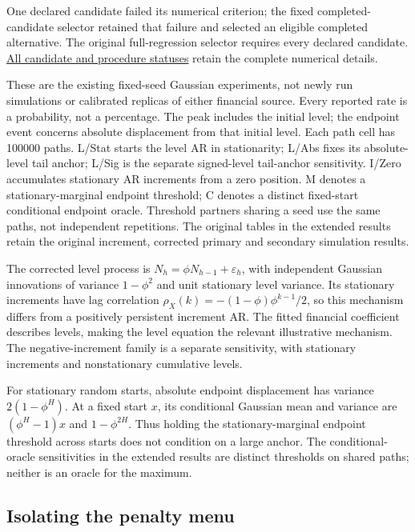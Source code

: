 \documentclass[10pt,a4paper]{article}
\begin{document}
One declared candidate failed its numerical criterion; the fixed completed-candidate selector retained that failure and selected an eligible completed alternative. The original full-regression selector requires every declared candidate. \href{https://github.com/ByronLi0207/financial-mathematics-paper-20261020/blob/submission-final/EXTENDED_RESULTS.md#asmbi-extended-s24}{All candidate and procedure statuses} retain the complete numerical details.

These are the existing fixed-seed Gaussian experiments, not newly run
simulations or calibrated replicas of either financial source. Every reported
rate is a probability, not a percentage. The peak includes the initial level;
the endpoint event concerns absolute displacement from that initial level.
Each path cell has 100000 paths.
L/Stat starts the level AR in stationarity; L/Abs fixes its absolute-level
tail anchor; L/Sig is the separate signed-level tail-anchor sensitivity.
I/Zero accumulates stationary AR increments from a zero position.
M denotes a stationary-marginal endpoint threshold; C denotes a distinct
fixed-start conditional endpoint oracle. Threshold partners sharing a seed use
the same paths, not independent repetitions.
The original tables in the extended results retain the original increment, corrected primary and secondary simulation results.

The corrected level process is
\(N_h=\phi N_{h-1}+\varepsilon_h\), with independent Gaussian innovations
of variance \(1-\phi^2\) and unit stationary level variance. Its stationary
increments have lag correlation
\(\rho_X(k)=-(1-\phi)\phi^{k-1}/2\), so this mechanism differs from a
positively persistent increment AR. The fitted financial coefficient describes
levels, making the level equation the relevant illustrative mechanism.
The negative-increment family is a separate sensitivity, with stationary
increments and nonstationary cumulative levels.

For stationary random starts, absolute endpoint displacement has
variance \(2(1-\phi^H)\). At a fixed start \(x\), its conditional Gaussian
mean and variance are \((\phi^H-1)x\) and \(1-\phi^{2H}\). Thus holding the
stationary-marginal endpoint threshold across starts does not condition on a
large anchor. The conditional-oracle sensitivities in the extended results are distinct thresholds
on shared paths; neither is an oracle for the maximum.

\subsection{Isolating the penalty menu}\label{sec:extensions}
\end{document}
